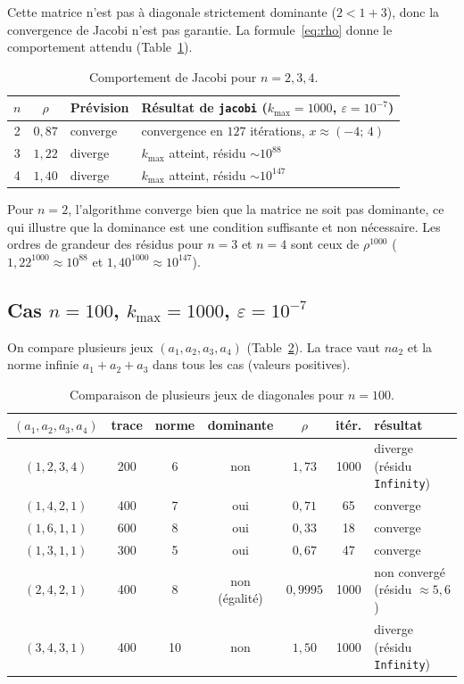 \documentclass[a4paper]{scrartcl}
\begin{document}
Cette matrice n'est pas à diagonale strictement dominante ($2<1+3$), donc la convergence de Jacobi n'est pas garantie. 
La formule~\eqref{eq:rho} donne le comportement attendu (Table~\ref{tbl:n234}).
\begin{table}[!ht]
\centering
\begin{tabular}{|c|c|l|l|}
\hline
$n$ & $\rho$ & Prévision & Résultat de \texttt{jacobi} ($k_{\max}=1000$, $\varepsilon=10^{-7}$) \\ \hline
2 & $0{,}87$ & converge & convergence en $127$ itérations, $x\approx(-4;\,4)$ \\ \hline
3 & $1{,}22$ & diverge & $k_{\max}$ atteint, résidu $\sim10^{88}$ \\ \hline
4 & $1{,}40$ & diverge & $k_{\max}$ atteint, résidu $\sim10^{147}$ \\ \hline
\end{tabular}
\caption{Comportement de Jacobi pour $n=2,3,4$.}
\label{tbl:n234}
\end{table}
Pour $n=2$, l'algorithme converge bien que la matrice ne soit pas dominante, ce qui illustre que la dominance est 
une condition suffisante et non nécessaire. Les ordres de grandeur des résidus pour $n=3$ et $n=4$ sont ceux de 
$\rho^{1000}$ ($1{,}22^{1000}\approx10^{88}$ et $1{,}40^{1000}\approx10^{147}$).

\subsection{Cas $n=100$, $k_{\max}=1000$, $\varepsilon=10^{-7}$}

On compare plusieurs jeux $(a_1,a_2,a_3,a_4)$ (Table~\ref{tbl:cas}). La trace vaut $na_2$ et la norme infinie 
$a_1+a_2+a_3$ dans tous les cas (valeurs positives).
\begin{table}[!ht]
\centering
\small
\begin{tabular}{|c|c|c|c|c|c|l|}
\hline
$(a_1,a_2,a_3,a_4)$ & trace & norme & dominante & $\rho$ & itér. & résultat \\ \hline
$(1,2,3,4)$ & 200 & 6 & non & $1{,}73$ & 1000 & diverge (résidu \texttt{Infinity}) \\ \hline
$(1,4,2,1)$ & 400 & 7 & oui & $0{,}71$ & 65 & converge \\ \hline
$(1,6,1,1)$ & 600 & 8 & oui & $0{,}33$ & 18 & converge \\ \hline
$(1,3,1,1)$ & 300 & 5 & oui & $0{,}67$ & 47 & converge \\ \hline
$(2,4,2,1)$ & 400 & 8 & non (égalité) & $0{,}9995$ & 1000 & non convergé (résidu $\approx5{,}6$) \\ \hline
$(3,4,3,1)$ & 400 & 10 & non & $1{,}50$ & 1000 & diverge (résidu \texttt{Infinity}) \\ \hline
\end{tabular}
\caption{Comparaison de plusieurs jeux de diagonales pour $n=100$.}
\label{tbl:cas}
\end{table}
\end{document}
